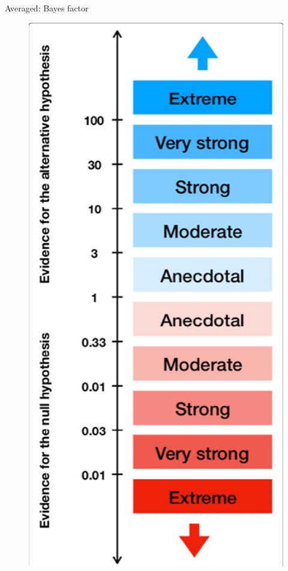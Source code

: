 \documentclass[
aspectratio=169,
14pt,
professionalfonts
]{beamer}
\begin{document}
\begin{frame}{Averaged: Bayes factor}
\begin{minipage}{0.25\textwidth}
\begin{figure}
{                \includegraphics[width=\textwidth]{../plots/jeffreys-scale.png}
                }
            \end{figure}
        \end{minipage}
    \end{frame}
\end{document}
